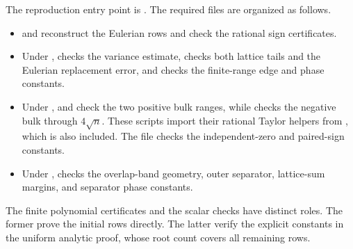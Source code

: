 The reproduction entry point is . The required
files are organized as follows.
\begin{itemize}
\item {} and
 reconstruct the Eulerian rows and check the
rational sign certificates.
\item Under ,
 checks the variance estimate,
 checks both lattice tails and
the Eulerian replacement error, and 
checks the finite-range edge and phase constants.
\item Under ,
 and
 check the two positive
bulk ranges, while 
checks the negative bulk through $4\sqrt n$.
These scripts import their rational Taylor helpers from
, which is also included.
The file  checks the
independent-zero and paired-sign constants.
\item Under ,
 checks the overlap-band
geometry, outer separator, lattice-sum margins, and separator phase
constants.
\end{itemize}

The finite polynomial certificates and the scalar checks have distinct
roles. The former prove the initial rows directly. The latter verify the
explicit constants in the uniform analytic proof, whose root count
covers all remaining rows.
